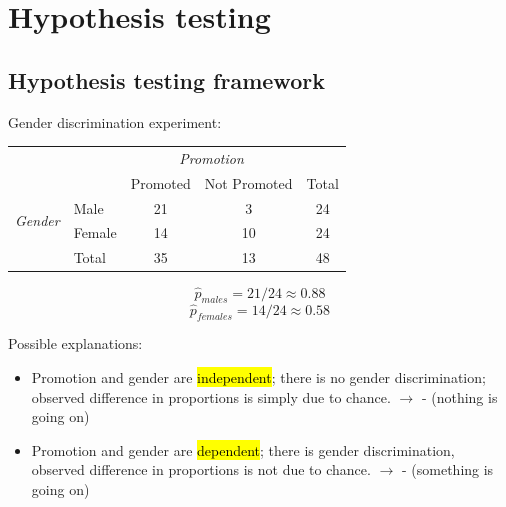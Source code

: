 
\section{Hypothesis testing}


\subsection{Hypothesis testing framework}


\begin{frame}

Gender discrimination experiment:

{\small
\begin{tabular}{ll  cc c} 
  		&				& \multicolumn{2}{c}{\textit{Promotion}} \\
\cline{3-4}
							&			& Promoted	& Not Promoted 	& Total	\\
\cline{2-5}
\multirow{2}{*}{\textit{Gender	}}	&Male 		& 21	 	& 3		& 24 	\\
							&Female		& 14	 	& 10 	 	& 24 \\
\cline{2-5}
							&Total		& 35		& 13		& 48 \\
\end{tabular}
}

\pause

\[ \hat{p}_{males} = 21 / 24 \approx 0.88 \]
\[ \hat{p}_{females} = 14 / 24 \approx 0.58 \]

\pause

Possible explanations:\pause
\begin{itemize}
\item Promotion and gender are \hl{independent}; there is no gender discrimination; observed difference in proportions is simply due to chance. $\rightarrow$  - {\small (nothing is going on)}
\item Promotion and gender are \hl{dependent}; there is gender discrimination, observed difference in proportions is not due to chance. $\rightarrow$  - {\small (something is going on)}

\end{itemize}

\end{frame}


